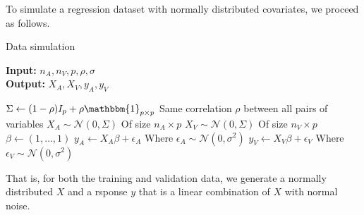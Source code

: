 To simulate a regression dataset with normally distributed covariates, we proceed as follows.

\begin{algorithm}[H]
	\caption{Data simulation}
	\hspace*{\algorithmicindent} \textbf{Input:} $n_A,n_V,p,\rho, \sigma$\\
	\hspace*{\algorithmicindent} \textbf{Output:} $X_A, X_V, y_A, y_V$  \\
	\begin{algorithmic}[1]
		\State $\Sigma \leftarrow (1-\rho) I_p + \rho \mathbbm{1}_{p\times p}$ \Comment Same correlation $\rho$ between all pairs of variables
		\State $X_A \sim \mathcal{N}(0,\Sigma)$ \Comment Of size $n_A \times p$
		\State $X_V \sim \mathcal{N}(0,\Sigma)$ \Comment Of size $n_V \times p$
		\State $\beta \leftarrow (1,\ldots,1)$
		\State $y_A \leftarrow X_A \beta + \epsilon_A$ \Comment Where $\epsilon_A \sim \mathcal{N}(0,\sigma^2)$
		\State $y_V \leftarrow X_V \beta + \epsilon_V$ \Comment Where $\epsilon_V \sim \mathcal{N}(0,\sigma^2)$
	\end{algorithmic}
\end{algorithm}

That is, for both the training and validation data, we generate a normally distributed $X$ and a rsponse $y$ that is a linear combination of $X$ with normal noise.